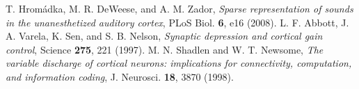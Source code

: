  T. Hrom\'adka, M. R. DeWeese, and A. M. Zador, \emph{Sparse representation of sounds in the unanesthetized auditory cortex}, PLoS Biol. \textbf{6}, e16 (2008).
 L. F. Abbott, J. A. Varela, K. Sen, and S. B. Nelson, \emph{Synaptic depression and cortical gain control}, Science \textbf{275}, 221 (1997).
 M. N. Shadlen and W. T. Newsome, \emph{The variable discharge of cortical neurons: implications for connectivity, computation, and information coding}, J. Neurosci. \textbf{18}, 3870 (1998).
